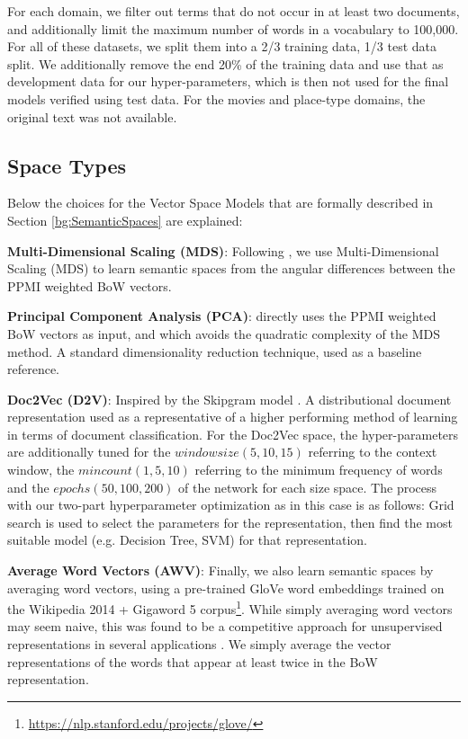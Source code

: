  For each domain, we filter out terms that do not occur in at least two documents, and additionally limit the maximum number of words in a vocabulary to 100,000. For all of these datasets, we split them into a 2/3 training data, 1/3 test data split. We additionally remove the end 20\% of the training data and use that as development data for our hyper-parameters, which is then not used for the final models verified using test data.  For the movies and place-type domains, the original text was not available.



\subsection{Space Types}

Below the choices for the Vector Space Models that are formally described in Section \ref{bg:SemanticSpaces} are explained:

\textbf{Multi-Dimensional Scaling (MDS)}: Following \cite{derracAIJ}, we use Multi-Dimensional Scaling (MDS) to learn semantic spaces from the angular differences between the PPMI weighted BoW vectors. %

\textbf{Principal Component Analysis (PCA)}: directly uses the PPMI weighted BoW vectors as input, and which avoids the quadratic complexity of the MDS method. A standard dimensionality reduction technique, used as a baseline reference.

\textbf{Doc2Vec (D2V)}: Inspired by the Skipgram model \cite{DBLP:conf/icml/LeM14}.  A distributional document representation used as a representative of a higher performing method of learning in terms of document classification. For the Doc2Vec space, the hyper-parameters are additionally tuned for the $window size (5, 10, 15)$ referring to the context window, the $min count (1, 5, 10)$ referring to the minimum frequency of words and the $epochs (50, 100, 200)$ of the network for each size space. The process with our two-part hyperparameter optimization as in this case is as follows: Grid search is used to select the parameters for the representation, then find the most suitable model (e.g. Decision Tree, SVM) for that representation. 

\textbf{Average Word Vectors (AWV)}: Finally, we also learn semantic spaces by averaging word vectors, using a pre-trained GloVe word embeddings trained on the Wikipedia 2014 + Gigaword 5 corpus\footnote{\url{https://nlp.stanford.edu/projects/glove/}}. While simply averaging word vectors may seem naive, this was found to be a competitive approach for unsupervised representations in several applications \cite{DBLP:conf/naacl/HillCK16}. We simply average the vector representations of the words that appear at least twice in the BoW representation.


